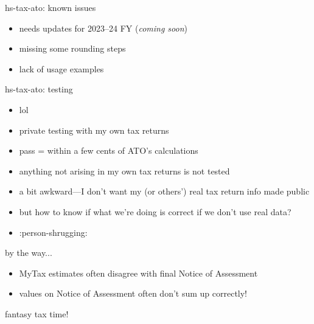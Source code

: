 \documentclass[ignorenonframetext,aspectratio=169,12pt]{beamer}
\begin{document}
\begin{frame}{hs-tax-ato: known issues}
\begin{itemize}
  \item needs updates for 2023--24 FY ({\em coming soon})
  \item missing some rounding steps
  \item lack of usage examples
\end{itemize}
\end{frame}

\begin{frame}{hs-tax-ato: testing}
\begin{itemize}
  \item lol
  \item private testing with my own tax returns
  \item pass = within a few cents of ATO's calculations
  \item anything not arising in my own tax returns is not tested
  \item a bit awkward---I don't want my (or others') real tax return
      info made public
  \item but how to know if what we're doing is correct if we don't
      use real data?
  \item :person-shrugging:
\end{itemize}
\end{frame}

\begin{frame}{by the way...}
\begin{itemize}
  \item MyTax estimates often disagree with final Notice of Assessment
  \item values on Notice of Assessment often don't sum up correctly!
\end{itemize}
\end{frame}

\begin{frame}[plain]
\centering
\Large
  fantasy tax time!
\end{frame}


\end{document}

